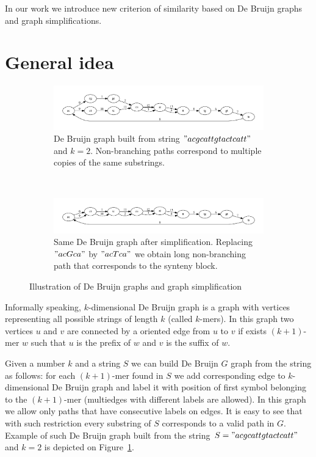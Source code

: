 \documentclass[a4paper,12pt]{scrartcl}
\begin{document}
In our work we introduce new criterion of similarity based on De Bruijn graphs and graph simplifications.

\section{General idea}

\begin{figure}
        \begin{subfigure}[a]{1\textwidth}
		\includegraphics[scale = 0.50]{graph1.pdf}
		\small \caption{De Bruijn graph built from string \("acgcattgtactcatt"\) and \(k = 2\). Non-branching paths correspond to multiple
			copies of the same substrings.}
		\label{DeBruijnA}
        \end{subfigure}
	\\
        \begin{subfigure}[b]{1\textwidth}
		\includegraphics[scale = 0.50]{graph2.pdf}
		\small \caption{Same De Bruijn graph after simplification. Replacing \("acGca"\) by \("acTca"\) we obtain long non-branching path
			that corresponds to the synteny block.}
		\label{DeBruijnB}
        \end{subfigure}
	\small \caption{Illustration of De Bruijn graphs and graph simplification}
\end{figure}

Informally speaking, \(k\)-dimensional De Bruijn graph is a graph with vertices representing all possible strings of length \(k\)
(called \(k\)-mers). In this graph two vertices \(u\) and \(v\) are connected by a oriented edge from \(u\) to \(v\) if exists
\((k + 1)\)-mer \(w\) such that \(u\) is the prefix of \(w\) and \(v\) is the suffix of \(w\).

Given  a number \(k\) and a string \(S\) we can build De Bruijn \(G\) graph from the string as follows: for each \((k + 1)\)-mer found 
in \(S\) we add corresponding edge to \(k\)-dimensional De Bruijn graph and label it with position of first symbol belonging to
the \((k + 1)\)-mer (multiedges with different labels are allowed). In this graph we allow only paths that have consecutive labels
on edges. It is easy to see that with such restriction every substring of \(S\) corresponds to a valid path in \(G\). Example of such
De Bruijn graph built from the string \(S = "acgcattgtactcatt" \) and \(k = 2\) is depicted on Figure~\ref{DeBruijnA}.
\end{document}

